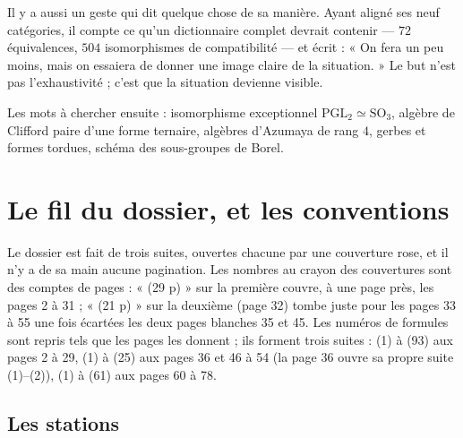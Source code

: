 \documentclass[11pt,a4paper]{article}
\begin{document}
\begin{resume}
Il y a aussi un geste qui dit quelque chose de sa manière. Ayant aligné ses
neuf catégories, il compte ce qu'un dictionnaire complet devrait contenir —
$72$ équivalences, $504$ isomorphismes de compatibilité — et écrit : « On fera un
peu moins, mais on essaiera de donner une image claire de la situation. » Le
but n'est pas l'exhaustivité ; c'est que la situation devienne visible.

Les mots à chercher ensuite : isomorphisme exceptionnel
$\mathrm{PGL}_2 \simeq \mathrm{SO}_3$, algèbre de Clifford paire d'une forme
ternaire, algèbres d'Azumaya de rang $4$, gerbes et formes tordues, schéma des
sous-groupes de Borel.

\end{resume}

\section*{Le fil du dossier, et les conventions}

Le dossier est fait de trois suites, ouvertes chacune par une couverture rose,
et il n'y a de sa main aucune pagination. Les nombres au crayon des couvertures
sont des comptes de pages : « (29 p) » sur la première couvre, à une page près,
les pages 2 à 31 ; « (21 p) » sur la deuxième (page 32) tombe juste pour les
pages 33 à 55 une fois écartées les deux pages blanches 35 et 45. Les numéros de
formules sont repris tels que les pages les donnent ; ils forment trois suites :
(1) à (93) aux pages 2 à 29, (1) à (25) aux pages 36 et 46 à 54 (la page 36
ouvre sa propre suite (1)--(2)), (1) à (61) aux pages 60 à 78.

\subsection*{Les stations}
\end{document}

